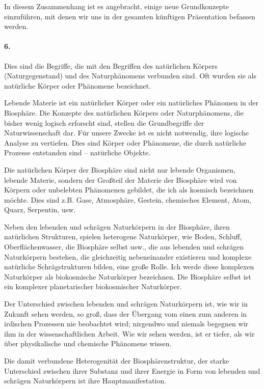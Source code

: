 \documentclass[11pt,a4paper]{book}
\begin{document}
In diesem Zusammenhang ist es angebracht, einige neue Grundkonzepte
einzuführen, mit denen wir uns in der gesamten künftigen Präsentation befassen
werden.

\paragraph{6.}
Dies sind die Begriffe, die mit den Begriffen des natürlichen Körpers
(Naturgegenstand) und des Naturphänomens verbunden sind. Oft wurden sie als
natürliche Körper oder Phänomene bezeichnet.

Lebende Materie ist ein natürlicher Körper oder ein natürliches Phänomen in
der Biosphäre. Die Konzepte des natürlichen Körpers oder Naturphänomens, die
bisher wenig logisch erforscht sind, stellen die Grundbegriffe der
Naturwissenschaft dar. Für unsere Zwecke ist es nicht notwendig, ihre logische
Analyse zu vertiefen. Dies sind Körper oder Phänomene, die durch natürliche
Prozesse entstanden sind -- natürliche Objekte.

Die natürlichen Körper der Biosphäre sind nicht nur lebende Organismen,
lebende Materie, sondern der Großteil der Materie der Biosphäre wird von
Körpern oder unbelebten Phänomenen gebildet, die ich als kosmisch bezeichnen
möchte. Dies sind z.B. Gase, Atmosphäre, Gestein, chemisches Element, Atom,
Quarz, Serpentin, usw.

Neben den lebenden und schrägen Naturkörpern in der Biosphäre, ihren
natürlichen Strukturen, spielen heterogene Naturkörper, wie Boden, Schluff,
Oberflächenwasser, die Biosphäre selbst usw., die aus lebenden und schrägen
Naturkörpern bestehen, die gleichzeitig nebeneinander existieren und komplexe
natürliche Schrägstrukturen bilden, eine große Rolle. Ich werde diese
komplexen Naturkörper als biokosmische Naturkörper bezeichnen. Die Biosphäre
selbst ist ein komplexer planetarischer biokosmischer Naturkörper.

Der Unterschied zwischen lebenden und schrägen Naturkörpern ist, wie wir in
Zukunft sehen werden, so groß, dass der Übergang vom einen zum anderen in
irdischen Prozessen nie beobachtet wird; nirgendwo und niemals begegnen wir
ihm in der wissenschaftlichen Arbeit. Wie wir sehen werden, ist er tiefer, als
wir über physikalische und chemische Phänomene wissen.

Die damit verbundene Heterogenität der Biosphärenstruktur, der starke
Unterschied zwischen ihrer Substanz und ihrer Energie in Form von lebenden und
schrägen Naturkörpern ist ihre Hauptmanifestation.
\end{document}
